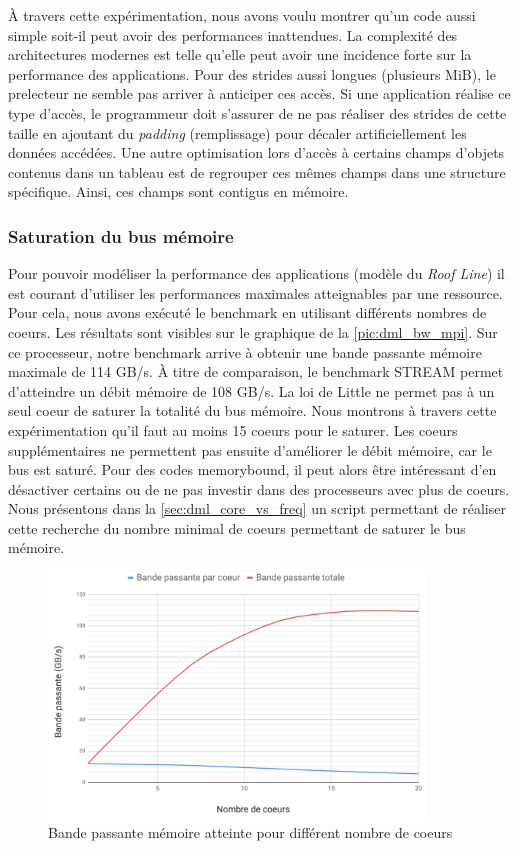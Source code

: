         À travers cette expérimentation, nous avons voulu montrer qu'un code aussi simple soit-il peut avoir des performances inattendues. La complexité des architectures modernes est telle qu'elle peut avoir une incidence forte sur la performance des applications. Pour des strides aussi longues (plusieurs MiB), le \gls{prelecteur} ne semble pas arriver à anticiper ces accès. Si une application réalise ce type d'accès, le programmeur doit s'assurer de ne pas réaliser des strides de cette taille en ajoutant du \textit{padding} (remplissage) pour décaler artificiellement les données accédées. Une autre optimisation lors d'accès à certains champs d'objets contenus dans un tableau est de regrouper ces mêmes champs dans une structure spécifique. Ainsi, ces champs sont contigus en mémoire. 
        

    \subsubsection{Saturation du bus mémoire}\label{sec:dml_saturation}
        Pour pouvoir modéliser la performance des applications (modèle du \textit{Roof Line}) il est courant d'utiliser les performances maximales atteignables par une ressource. Pour cela, nous avons exécuté le benchmark en utilisant différents nombres de coeurs. Les résultats sont visibles sur le graphique de la \autoref{pic:dml_bw_mpi}. Sur ce processeur, notre benchmark arrive à obtenir une bande passante mémoire maximale de 114 GB/s. À titre de comparaison, le benchmark STREAM permet d'atteindre un débit mémoire de 108 GB/s. La loi de Little ne permet pas à un seul coeur de saturer la totalité du bus mémoire. Nous montrons à travers cette expérimentation qu'il faut au moins 15 coeurs pour le saturer. Les coeurs supplémentaires ne permettent pas ensuite d'améliorer le débit mémoire, car le bus est saturé. Pour des codes \gls{memorybound}, il peut alors être intéressant d'en désactiver certains ou de ne pas investir dans des processeurs avec plus de coeurs. Nous présentons dans la \autoref{sec:dml_core_vs_freq} un script permettant de réaliser cette recherche du nombre minimal de coeurs permettant de saturer le bus mémoire. 
        
        \begin{figure}
        \center
        \includegraphics[width=10cm]{images/dml_bw_mpi.png}
        \caption{\label{pic:dml_bw_mpi} Bande passante mémoire atteinte pour différent nombre de coeurs}
        \end{figure}
        
